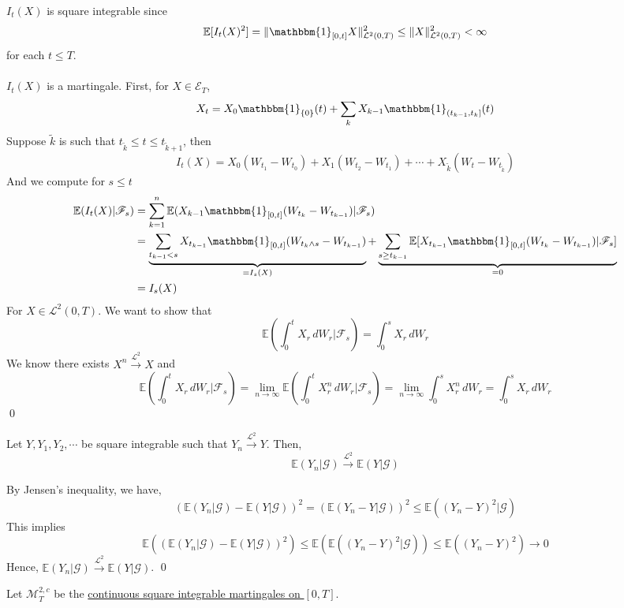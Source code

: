 \documentclass[12pt,a4paper]{article}
\newcommand{\E}{\mathbb{E}}
\renewenvironment{proof}
    {\begin{trivlist}\item[\hskip\labelsep\color{blue}\bfseries Proof:]}
    {\qed\end{trivlist}}
\begin{document}
\begin{proof}
    $I_t(X)$ is square integrable since
    $$
    \E[I_t(X)^2] = \|\mathbbm{1}_{[0,t]}X\|^2_{\mathcal{L}^2(0,T)} \le \|X\|^2_{\mathcal{L}^2(0,T)}<\infty
    $$
    for each $t\le T$.\\
    \\
    $I_t(X)$ is a martingale. First, for $X\in\mathcal{E}_T$, 
    $$
    X_t = X_0\mathbbm{1}_{\{0\}}(t) + \sum_k X_{k-1}\mathbbm{1}_{(t_{k-1},t_k]}(t)
    $$
    Suppose $\tilde k$ is such that $t_{\tilde k}\le t\le t_{\tilde k+1}$, then 
    $$
    I_t(X) = X_0(W_{t_1}-W_{t_0})+ X_{1}(W_{t_2}-W_{t_1})+\cdots + X_{\tilde k}(W_{t}-W_{t_{\tilde k}})
    $$
    And we compute for $s\le t$
    \begin{align*}
        \E(I_t(X)|\mathscr{F}_s) &= \sum_{k=1}^n \E(X_{k-1}\mathbbm{1}_{[0,t]}(W_{t_k}-W_{t_{k-1}})|\mathscr{F}_s)\\
        &= \underbrace{\sum_{t_{k-1}<s} X_{t_{k-1}}\mathbbm{1}_{[0,t]} (W_{t_k\wedge s}-W_{t_{k-1}})}_{=I_s(X)} + \underbrace{\sum_{s\ge t_{k-1}}\E[X_{t_{k-1}}\mathbbm{1}_{[0,t]}(W_{t_k}-W_{t_{k-1}})|\mathscr{F}_s]}_{=0}\\
        &= I_s(X)
    \end{align*}
    For $X\in \mathcal{L}^2(0,T)$. We want to show that 
    $$
    \E\left(\int_0^t X_r\, dW_r |\mathscr{F}_s\right) = \int_0^s X_r\, dW_r
    $$
    We know there exists $X^n\xrightarrow{\mathcal{L}^2}X$ and
    $$
    \E\left(\int_0^t X_r\, dW_r|\mathscr{F}_s\right) = \lim_{n\to\infty} \E\left(\int_0^t X^n_r\, dW_r|\mathscr{F}_s\right) = \lim_{n\to\infty}\int_0^s X^n_r\,dW_r = \int_0^s X_r\,dW_r
    $$
\end{proof}
\pagebreak
\begin{lemma}{}{}
    Let $Y,Y_1, Y_2,\cdots$ be square integrable such that $Y_n\xrightarrow{\mathcal{L}^2} Y$. Then,
    $$
    \E(Y_n|\mathscr{G})\xrightarrow{\mathcal{L}^2}\E(Y|\mathscr{G})
    $$
\end{lemma}
\begin{proof}
    By Jensen's inequality, we have,
    $$
    (\E(Y_n|\mathscr{G})-\E(Y|\mathscr{G}))^2 = (\E(Y_n-Y|\mathscr{G}))^2\le \E((Y_n-Y)^2|\mathscr{G})
    $$
    This implies
    $$
    \E( (\E(Y_n|\mathscr{G})-\E(Y|\mathscr{G}))^2)\le \E(\E((Y_n-Y)^2|\mathscr{G}))\le \E((Y_n-Y)^2)\to 0
    $$
    Hence, $\E(Y_n|\mathscr{G})\xrightarrow{\mathcal{L}^2}\E(Y|\mathscr{G})$.
\end{proof}
\begin{definition}{}{}
    Let $\mathcal{M}^{2,c}_T$ be the \underline{continuous square integrable martingales on $[0,T]$}.
\end{definition}
\end{document}
